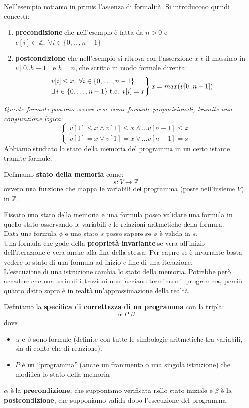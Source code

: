 \documentclass[a4paper,12pt, oneside]{book}
\begin{document}
Nell'esempio notiamo in primis l'assenza di formalità. Si introducono quindi
concetti:
\begin{enumerate}
  \item \textbf{precondizione} che nell'esempio è fatta da $n>0$ e
  $v[i]\in\mathbb{Z},\,\,\forall i\in \{0,\ldots, n-1\}$
  \item \textbf{postcondizione} che nell'esempio si ritrova con l'asserzione $x$
  è il massimo in $v[0..h-1]$ e $h=n$, che scritto in modo formale diventa:
  \[
    \begin{rcases}
      v[i]\leq x,\,\,\forall i\in \{0,\ldots, n-1\}\\
      \exists\,i\in\{0,\ldots, n-1\}\mbox{ t.c. } v[i]=x
    \end{rcases}
    x=max(v[0..n-1])
  \]
\end{enumerate}
\textit{Queste formule possono essere rese come formule proposizionali, tramite
  una congiunzione logica:}
\[
  \begin{cases}
    v[0]\leq x \land v[1]\leq x\land\ldots v[n-1]\leq x\\
    v[0]= x \lor v[1]= x\lor\ldots v[n-1]=x
  \end{cases}
\]
Abbiamo studiato lo stato della memoria del programma in un certo istante
tramite formule.
\begin{definizione}
  Definiamo \textbf{stato della memoria} come:
  \[s:V\to\mathbb{Z}\]
  ovvero una funzione che mappa le variabili del programma (poste nell'insieme
  $V$) in $\mathbb{Z}$.
\end{definizione}
Fissato uno stato della memoria e una formula posso validare una formula in
quello stato osservando le variabili e le relazioni aritmetiche della
formula.\\
Data una formula $\phi$ e uno stato $s$ posso sapere se $\phi$ è valida in
$s$.\\
Una formula che gode della \textbf{proprietà invariante} se vera all'inizio
dell'iterazione è vera anche alla fine della stessa. Per capire se è invariante
basta vedere lo stato di una formula ad inizio e fine di una iterazione.\\
L'esecuzione di una istruzione cambia lo stato della memoria. Potrebbe però
accadere che una serie di istruzioni non facciano terminare il programma, perciò
quanto detto sopra è in realtà un'approssimazione della realtà.
\begin{definizione}
  Definiamo la \textbf{specifica di correttezza di un programma} con la tripla:
  \[\alpha\,\, P\,\, \beta\]
  dove:
  \begin{itemize}
    \item $\alpha$ e $\beta$ sono formule (definite con tutte le simbologie
    aritmetiche tra variabili, sia di conto che di relazione).
    \item $P$ è un ``programma'' (anche un frammento o una singola istruzione) che
    modifica lo stato della memoria.
  \end{itemize}
  $\alpha$ è la \textbf{precondizione}, che supponiamo verificata nello stato
  iniziale e $\beta$ è la \textbf{postcondizione}, 
  che supponiamo valida dopo l'esecuzione del programma.
\end{definizione}
\end{document}
